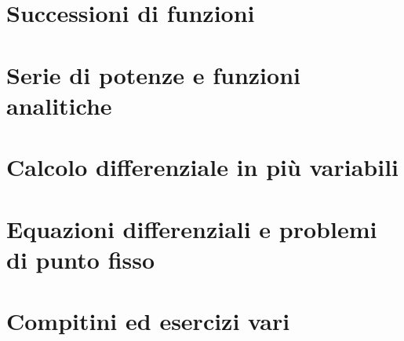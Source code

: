 \documentclass[a4paper]{article}
\begin{document}
\section{Successioni di funzioni}


\section{Serie di potenze e funzioni analitiche}


\section{Calcolo differenziale in più variabili}


\section{Equazioni differenziali e problemi di punto fisso}


\appendix
\section{Compitini ed esercizi vari}

\end{document}
